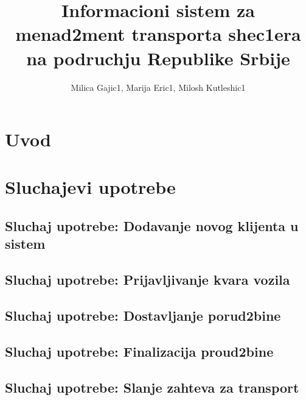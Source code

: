 \documentclass{article}
\title{Informacioni sistem za menad2ment transporta shec1era na podruchju Republike Srbije}
\author{Milica Gajic1, Marija Eric1, Milosh Kutleshic1}
\begin{document}
\maketitle
\newpage


\renewcommand*\contentsname{Sadrz1aj}
\tableofcontents
\newpage

\section{Uvod}

\section{Sluchajevi upotrebe}
\subsection{Sluchaj upotrebe: Dodavanje novog klijenta u sistem}


\subsection{Sluchaj upotrebe: Prijavljivanje kvara vozila}

\subsection{Sluchaj upotrebe: Dostavljanje porud2bine}

\subsection{Sluchaj upotrebe: Finalizacija proud2bine}


\subsection{Sluchaj upotrebe: Slanje zahteva za transport}


\nocite{*}
\selectfont



\end{document}
